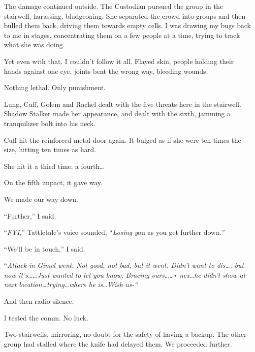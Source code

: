 The damage continued outside.  The Custodian pursued the group in the stairwell, harassing, bludgeoning.  She separated the crowd into groups and then bulled them back, driving them towards empty cells.  I was drawing my bugs back to me in stages, concentrating them on a few people at a time, trying to track what she was doing.



Yet even with that, I couldn't follow it all.  Flayed skin, people holding their hands against one eye, joints bent the wrong way, bleeding wounds.



Nothing lethal.  Only punishment.



Lung, Cuff, Golem and Rachel dealt with the five threats here in the stairwell.  Shadow Stalker made her appearance, and dealt with the sixth, jamming a tranquilizer bolt into his neck.



Cuff hit the reinforced metal door again.  It bulged as if she were ten times the size, hitting ten times as hard.



She hit it a third time, a fourth\ldots



On the fifth impact, it gave way.



We made our way down.



``Further,'' I said.



``\emph{FYI,}'' Tattletale's voice sounded, ``\emph{Losing y}ou as you get further down\emph{.''}



``We'll be in touch,'' I said.



``\emph{Attack in Gimel went.  Not good, not bad, but it went.  Didn't want to dis\ldots, but now it's\ldots    \ldots{}Just wanted to let you know.  Bracing ours\ldots \ldots{}r nex\ldots he didn't show at next location\ldots trying\ldots  where he is\ldots Wish us-``}



And then radio silence.



I tested the comm.  No luck.



Two stairwells, mirroring, no doubt for the safety of having a backup.  The other group had stalled where the knife had delayed them.  We proceeded further.



